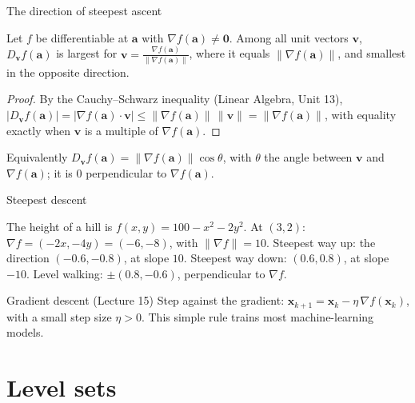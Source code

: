 \documentclass[10pt]{wosm-slides}
\newcommand{\norm}[1]{\lVert #1 \rVert}
\newcommand{\vx}{\mathbf{x}}
\newcommand{\va}{\mathbf{a}}
\DeclareRobustCommand{\vv}{\mathbf{v}}
\begin{document}
\begin{frame}{The direction of steepest ascent}
  \begin{theorem}
    Let $f$ be differentiable at $\va$ with $\nabla f(\va) \ne \mathbf{0}$. Among all unit vectors
    $\vv$, \ $D_\vv f(\va)$ is largest for $\vv = \frac{\nabla f(\va)}{\norm{\nabla f(\va)}}$, where it
    equals $\norm{\nabla f(\va)}$, and smallest in the opposite direction.
  \end{theorem}
  \pause
  \begin{proof}
    By the Cauchy--Schwarz inequality (Linear Algebra, Unit 13),
    $|D_\vv f(\va)| = |\nabla f(\va) \cdot \vv| \le \norm{\nabla f(\va)}\,\norm{\vv} = \norm{\nabla f(\va)}$,
    with equality exactly when $\vv$ is a multiple of $\nabla f(\va)$.
  \end{proof}
  \pause
  Equivalently $D_\vv f(\va) = \norm{\nabla f(\va)} \cos\theta$, with $\theta$ the angle between $\vv$
  and $\nabla f(\va)$; it is $0$ perpendicular to $\nabla f(\va)$.
\end{frame}

\begin{frame}{Steepest descent}
  \begin{example}[A hiker]
    The height of a hill is $f(x, y) = 100 - x^2 - 2y^2$. At $(3, 2)$:
    $\nabla f = (-2x, -4y) = (-6, -8)$, with $\norm{\nabla f} = 10$.
    Steepest way up: the direction $(-0.6, -0.8)$, at slope $10$. Steepest way down:
    $(0.6, 0.8)$, at slope $-10$. Level walking: $\pm(0.8, -0.6)$, perpendicular to $\nabla f$.
  \end{example}
  \pause
  \begin{block}{Gradient descent (Lecture 15)}
    Step against the gradient: $\vx_{k+1} = \vx_k - \eta\, \nabla f(\vx_k)$, with a small step
    size $\eta > 0$. This simple rule trains most machine-learning models.
  \end{block}
\end{frame}

\section{Level sets}
\end{document}
